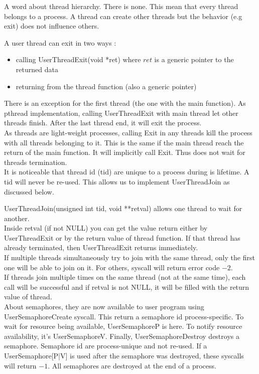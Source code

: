 A word about thread hierarchy. There is none. This mean that every thread
belongs to a process. A thread can create other threads but the behavior (e.g
exit) does not influence others.

A user thread can exit in two ways :
\begin{itemize}
    \item calling \textrm{UserThreadExit(void *ret)} where $ret$ is a generic
        pointer to the returned data
    \item returning from the thread function (also a generic pointer)
\end{itemize}

There is an exception for the first thread (the one with the main function). As
pthread implementation, calling \textrm{UserThreadExit} with main thread let
other threads finish. After the last thread end, it will exit the process.\\

As threads are light-weight processes, calling \textrm{Exit} in any threads
kill the process with all threads belonging to it. This is the same if the main
thread reach the return of the main function. It will implicitly call
\textrm{Exit}. Thus does not wait for threads termination.\\

It is noticeable that thread id (tid) are unique to a process during is
lifetime. A tid will never be re-used. This allows us to implement
\textrm{UserThreadJoin} as discussed below.

\textrm{UserThreadJoin(unsigned int tid, void **retval)} allows one thread to wait for
another.\\
Inside retval (if not NULL) you can get the value return either by
\textrm{UserThreadExit} or by the return value of thread function. If that
thread has already terminated, then \textrm{UserThreadExit} returns
immediately.\\
If multiple threads simultaneously try to join with the same thread, only the
first one will be able to join on it. For others, syscall will return error
code $-2$. \\
If threads join multiple times on the same thread (not at the same time), each
call will be successful and if retval is not NULL, it will be filled with the
return value of thread.\\

About semaphores, they are now available to user program using
UserSemaphoreCreate syscall. This return a semaphore id process-specific. To
wait for resource being available, \textrm{UserSemaphoreP} is here. To notify resource
availability, it's\textrm{ UserSemaphoreV}. Finally,\textrm{ UserSemaphoreDestroy} destroys a
semaphore. Semaphore id are process-unique and not re-used. If a
UserSemaphore[P|V] is used after the semaphore was destroyed, these syscalls
will return $-1$. All semaphores are destroyed at the end of a process.

